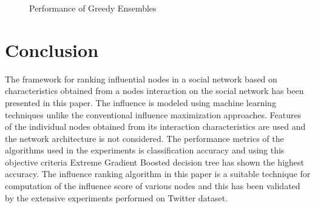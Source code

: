 \begin{figure}[H]
\centering
{}
\caption{Performance of Greedy Ensembles}
\label{fig 1}
\end{figure}



\section{Conclusion}
The framework for ranking influential nodes in a social network based on characteristics obtained from a nodes interaction on the social network has been presented in this paper. The influence is modeled using machine learning techniques unlike the conventional influence maximization approaches. Features of the individual nodes obtained from its interaction characteristics  are used and the network architecture is not considered. The performance metrics of the algorithms used in the experiments is classification accuracy and using this objective criteria Extreme Gradient Boosted decision tree has shown the highest accuracy. The influence ranking algorithm in this paper is a suitable technique for computation of the influence score of various nodes and this has been validated by the extensive experiments performed on Twitter dataset.  






